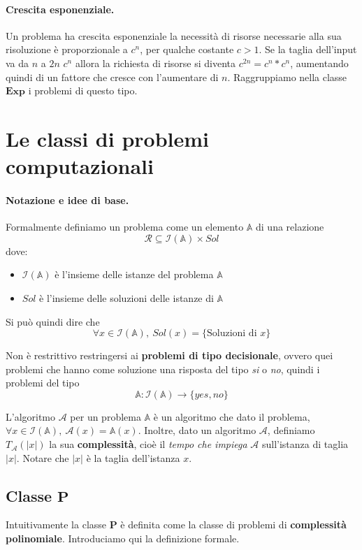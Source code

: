 \documentclass[a4paper]{article}
\theoremstyle{definition}
\newcommand{\Exp}{\mathbf{Exp}}
\newcommand{\p}{\mathbf{P}}
\newcommand{\prob}[1]{\mathbb{#1}}
\newcommand{\instance}[1]{\mathcal{I}(\prob{#1})}
\newcommand{\alg}[1]{\mathcal{#1}}
\newcommand{\compl}[2]{T_\alg{#1}( \vert #2 \vert)}
\begin{document}
			\paragraph{Crescita esponenziale.} Un problema ha crescita esponenziale la necessità di risorse necessarie alla sua risoluzione è proporzionale a $c^n$, per qualche costante $c > 1$. Se la taglia dell'input va da $n$ a  $2n$ $c^n$ allora la richiesta di risorse si diventa $c^{2n} = c^n * c^n$, aumentando quindi di un fattore che cresce con l'aumentare di $n$. Raggruppiamo nella classe $\Exp$ i problemi di questo tipo.
			
			\section{Le classi di problemi computazionali}
			\paragraph{Notazione e idee di base.}
			Formalmente definiamo un problema come un elemento $ \prob{A} $ di una relazione 
			\[ 
				\mathcal{R} \subseteq \instance{A} \times Sol 
			\] 
			dove: 
			\begin{itemize}
				\item $\instance{A}$ è l'insieme delle istanze del problema $\prob{A}$
				\item $Sol$ è l'insieme delle soluzioni delle istanze di $\prob{A}$
			\end{itemize}
			Si può quindi dire che 
			\[ 
				\forall x \in \instance{A},\ Sol(x) = \lbrace \text{Soluzioni di } x \rbrace 
			\]
			
			Non è restrittivo restringersi ai \textbf{problemi di tipo decisionale}, ovvero quei problemi che hanno come soluzione una risposta del tipo \textit{si} o \textit{no}, quindi i problemi del tipo \[ \prob{A} : \instance{A} \to \lbrace yes, no \rbrace \]
			
			
			L'algoritmo $\alg{A}$ per un problema $\prob{A}$ è un algoritmo che dato il problema, $\forall x \in \instance{A},\ \alg{A}(x) = \prob{A}(x)$. Inoltre, dato un algoritmo $ \alg{A} $, definiamo $\compl{A}{x}$ la sua \textbf{complessità}, cioè il \textit{tempo che impiega} $\alg{A}$ sull'istanza di taglia $\vert x \vert$. Notare che $\vert x \vert$ è la taglia dell'istanza $x$.
			
			\subsection{Classe $ \p $} 
			Intuitivamente la classe $\p$ è definita come la classe di problemi di \textbf{complessità polinomiale}. Introduciamo qui la definizione formale.
			
\end{document}
